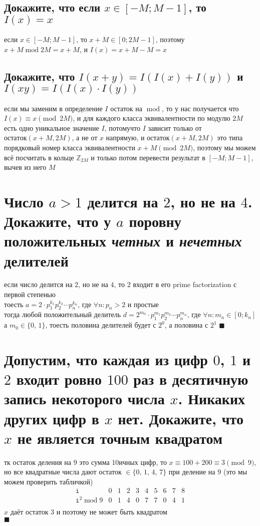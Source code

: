 \documentclass{article}
\newcommand{\Mod}[1]{\pmod{#1}}
\renewcommand{\mod}{\operatorname{mod}}
\begin{document}
  \subsection{Докажите, что если $x \in [-M; M-1]$, то $I(x) = x$}
  если $x \in [-M; M-1]$, то $x+M \in [0; 2M-1]$, поэтому $ x+M \operatorname{mod} 2M = x+M $, и $ I(x) = x+M-M = x$
  \subsection{Докажите, что $I(x+y) = I(I(x)+I(y))$ и $I(xy) = I(I(x) \cdot I(y))$}
  если мы заменим в определение $I$ остаток на $\operatorname{mod}$, то у нас получается что $I(x) \equiv x \Mod{2M}$,
  и для каждого класса эквивалентности по модулю $2M$ есть одно уникальное значение $I$,
  потомучто $I$ зависит только от $остаток(x+M, 2M)$, а не от $x$ напрямую,
  и $остаток(x+M, 2M)$ это типа порядковый номер класса эквивалентности $x+M \Mod{2M}$,
  поэтому мы можем всё посчитать в кольце $\mathbb{Z}_{2M}$
  и только потом перевести результат в $[-M; M-1]$, вычев из него $M$

  \section{Число $a > 1$ делится на $2$, но не на $4$. Докажите, что у $a$ поровну положительных \textit{четных} и \textit{нечетных} делителей}
  если число делится на $2$, но не на $4$, то $2$ входит в его prime factorization с первой степенью \\
  тоесть $a = 2 \cdot p_1^{k_1}p_2^{k_2} \cdots p_n^{k_n}$, где $\forall n:p_n>2$ и простые \\
  тогда любой положительный делитель $d = 2^{m_0} \cdot p_1^{m_1}p_2^{m_2} \cdots p_n^{m_n}$, где $\forall n:m_n \in [0;k_n]$ \\
  а $m_0 \in \{0,\,1\}$, тоесть половина делителей будет с $2^0$, а половина с $2^1$ $\blacksquare$

  \section{Допустим, что каждая из цифр $0$, $1$ и $2$ входит ровно $100$ раз в десятичную запись некоторого числа $x$. Никаких других цифр в $x$ нет. Докажите, что $x$ не является точным квадратом}
  тк остаток деления на $9$ это сумма 10ичных цифр, то $x \equiv 100+200 \equiv 3 \Mod{9}$, \\
  но все квадратные числа дают остаток $\in \{0,\, 1,\, 4,\, 7\}$ при деление на $9$ (это мы можем проверить табличкой)
  \[
    \begin{array}{c|cccccccccc}
      \texttt{i} & 0 & 1 & 2 & 3 & 4 & 5 & 6 & 7 & 8 \\
      \hline
      \texttt{i}^2 \mod 9 & 0 & 1 & 4 & 0 & 7 & 7 & 0 & 4 & 1 \\
    \end{array}
  \]
  $x$ даёт остаток $3$ и поэтому не может быть квадратом \\
  $\blacksquare$
\end{document}

